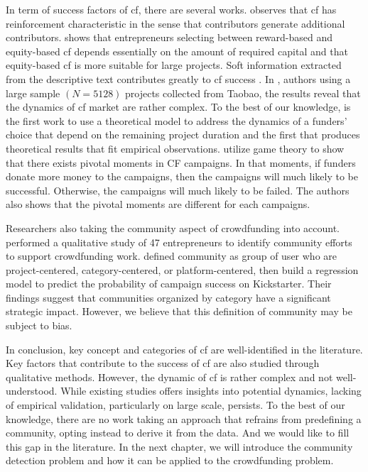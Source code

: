 In term of success factors of \acrshort{cf}, there are several works.
\parencite{colombo2015} observes that \acrshort{cf} has reinforcement characteristic in the sense that contributors generate additional contributors.
\parencite{belleflamme2015} shows that entrepreneurs selecting between reward-based and equity-based \acrshort{cf} depends
essentially on the amount of required capital and that equity-based \acrshort{cf} is more suitable for large projects.
Soft information extracted from the descriptive text contributes greatly to \acrshort{cf} success \parencite{jiang2020}.
In \parencite{xie2019}, authors using a large sample $(N=5128)$ projects collected from Taobao,
the results reveal that the dynamics of \acrshort{cf} market are rather complex.
To the best of our knowledge, \parencite{salahaldin2019} is the first work to use a theoretical model to address
the dynamics of a funders’ choice that depend on the remaining project duration
and the first that produces theoretical results that fit empirical observations.
\parencite{lindasalahaldin2022} utilize game theory to show that there exists pivotal moments in CF campaigns.
In that moments, if funders donate more money to the campaigns, then the campaigns will much likely to be successful.
Otherwise, the campaigns will much likely to be failed.
The authors also shows that the pivotal moments are different for each campaigns.

Researchers also taking the community aspect of crowdfunding into account.
\parencite{hui2014} performed a qualitative study of 47 entrepreneurs to identify community efforts to support crowdfunding work.
\parencite{inbar2014} defined community as group of user who are project-centered, category-centered, or platform-centered,
then build a regression model to predict the probability of campaign success on Kickstarter.
Their findings suggest that communities organized by category have a significant strategic impact.
However, we believe that this definition of community may be subject to bias.

In conclusion, key concept and categories of \acrshort{cf} are well-identified in the literature.
Key factors that contribute to the success of \acrshort{cf} are also studied through qualitative methods.
However, the dynamic of \acrshort{cf} is rather complex and not well-understood.
While existing studies offers insights into potential dynamics,
lacking of empirical validation, particularly on large scale, persists.
To the best of our knowledge,
there are no work taking an approach that refrains from predefining a community, opting instead to derive it from the data.
And we would like to fill this gap in the literature.
In the next chapter, we will introduce the community detection problem and how it can be applied to the crowdfunding problem.




